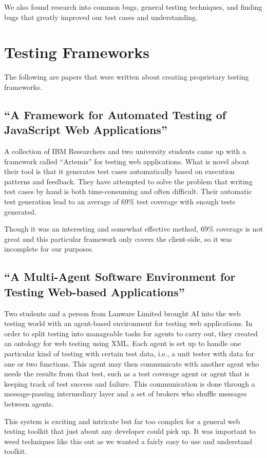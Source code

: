 \documentclass[12pt]{ucthesis}
\begin{document}
We also found research into common bugs, general testing techniques, and finding bugs that greatly improved our test cases and understanding.

\section{Testing Frameworks}
The following are papers that were written about creating proprietary testing frameworks.

\subsection{``A Framework for Automated Testing of JavaScript Web Applications''}
A collection of IBM Researchers and two university students came up with a framework called ``Artemis'' for testing web applications\cite{FrameworkForAutomatedTesting}. What is novel about their tool is that it generates test cases automatically based on execution patterns and feedback. They have attempted to solve the problem that writing test cases by hand is both time-consuming and often difficult. Their automatic test generation lead to an average of 69\% test coverage with enough tests generated.

Though it was an interesting and somewhat effective method, 69\% coverage is not great and this particular framework only covers the client-side, so it was incomplete for our purposes.

\subsection{``A Multi-Agent Software Environment for Testing Web-based Applications''}
Two students and a person from Lanware Limited brought AI into the web testing world with an agent-based environment for testing web applications\cite{MultiAgentSoftwareEnvironment}. In order to split testing into manageable tasks for agents to carry out, they created an ontology for web testing using XML. Each agent is set up to handle one particular kind of testing with certain test data, i.e., a unit tester with data for one or two functions. This agent may then communicate with another agent who needs the results from that test, such as a test coverage agent or agent that is keeping track of test success and failure. This communication is done through a message-passing intermediary layer and a set of brokers who shuffle messages between agents.

This system is exciting and intricate but far too complex for a general web testing toolkit that just about any developer could pick up. It was important to weed techniques like this out as we wanted a fairly easy to use and understand toolkit.
\end{document}

